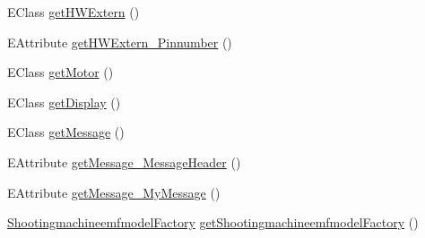 \begin{DoxyCompactItemize}
E\-Class \hyperlink{interfaceshootingmachineemfmodel_1_1_shootingmachineemfmodel_package_ac8be9580bc0261e1ab46e4d596cba73a}{get\-H\-W\-Extern} ()
\item 
E\-Attribute \hyperlink{interfaceshootingmachineemfmodel_1_1_shootingmachineemfmodel_package_a68016873106c1b2c0291270a0e3a540f}{get\-H\-W\-Extern\-\_\-\-Pinnumber} ()
\item 
E\-Class \hyperlink{interfaceshootingmachineemfmodel_1_1_shootingmachineemfmodel_package_a1d805c5360001d5b59912ffffce76733}{get\-Motor} ()
\item 
E\-Class \hyperlink{interfaceshootingmachineemfmodel_1_1_shootingmachineemfmodel_package_aa6b8937df7496f782eef12f9112a0544}{get\-Display} ()
\item 
E\-Class \hyperlink{interfaceshootingmachineemfmodel_1_1_shootingmachineemfmodel_package_a22f7d72713e5e103f3e8d509e1ce75ae}{get\-Message} ()
\item 
E\-Attribute \hyperlink{interfaceshootingmachineemfmodel_1_1_shootingmachineemfmodel_package_ad7f8ac42fa51f614c44066ce47a944c5}{get\-Message\-\_\-\-Message\-Header} ()
\item 
E\-Attribute \hyperlink{interfaceshootingmachineemfmodel_1_1_shootingmachineemfmodel_package_ac1bff97d907a89da3e0c7e155bbe0259}{get\-Message\-\_\-\-My\-Message} ()
\item 
\hyperlink{interfaceshootingmachineemfmodel_1_1_shootingmachineemfmodel_factory}{Shootingmachineemfmodel\-Factory} \hyperlink{interfaceshootingmachineemfmodel_1_1_shootingmachineemfmodel_package_a43a924cda032e157f0af7399cb0e5cbb}{get\-Shootingmachineemfmodel\-Factory} ()
\end{DoxyCompactItemize}
